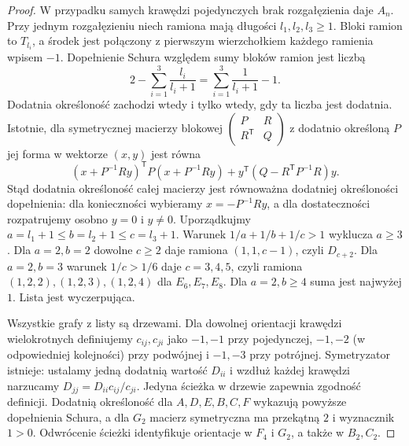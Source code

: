 \begin{proof}
W przypadku samych krawędzi pojedynczych brak
rozgałęzienia daje $A_n$. Przy jednym rozgałęzieniu
niech ramiona mają długości $l_1,l_2,l_3\ge1$.
Bloki ramion to $T_{l_i}$, a środek jest połączony
z pierwszym wierzchołkiem każdego ramienia wpisem $-1$.
Dopełnienie Schura względem sumy bloków ramion
jest liczbą
\[
 2-\sum_{i=1}^3\frac{l_i}{l_i+1}
 =\sum_{i=1}^3\frac1{l_i+1}-1.
\]
Dodatnia określoność zachodzi wtedy i tylko wtedy,
gdy ta liczba jest dodatnia. Istotnie, dla symetrycznej macierzy blokowej
$\begin{pmatrix}P&R\\R^{\mathsf T}&Q\end{pmatrix}$
z dodatnio określoną $P$ jej forma w wektorze $(x,y)$
jest równa
\[
 (x+P^{-1}Ry)^{\mathsf T}P(x+P^{-1}Ry)
 +y^{\mathsf T}(Q-R^{\mathsf T}P^{-1}R)y.
\]
Stąd dodatnia określoność całej macierzy jest
równoważna dodatniej określoności dopełnienia:
dla konieczności wybieramy $x=-P^{-1}Ry$,
a dla dostateczności rozpatrujemy osobno $y=0$
i $y\ne0$.
Uporządkujmy $a=l_1+1\le b=l_2+1\le c=l_3+1$.
Warunek $1/a+1/b+1/c>1$ wyklucza $a\ge3$.
Dla $a=2,b=2$ dowolne $c\ge2$ daje ramiona
$(1,1,c-1)$, czyli $D_{c+2}$.
Dla $a=2,b=3$ warunek $1/c>1/6$ daje $c=3,4,5$,
czyli ramiona $(1,2,2),(1,2,3),(1,2,4)$
dla $E_6,E_7,E_8$.
Dla $a=2,b\ge4$ suma jest najwyżej $1$.
Lista jest wyczerpująca.

Wszystkie grafy z listy są drzewami. Dla dowolnej
orientacji krawędzi wielokrotnych definiujemy
$c_{ij},c_{ji}$ jako $-1,-1$ przy pojedynczej,
$-1,-2$ (w odpowiedniej kolejności) przy podwójnej
i $-1,-3$ przy potrójnej. Symetryzator istnieje:
ustalamy jedną dodatnią wartość $D_{ii}$ i wzdłuż
każdej krawędzi narzucamy
$D_{jj}=D_{ii}c_{ij}/c_{ji}$. Jedyna ścieżka
w drzewie zapewnia zgodność definicji.
Dodatnią określoność dla $A,D,E,B,C,F$ wykazują
powyższe dopełnienia Schura, a dla $G_2$ macierz
symetryczna ma przekątną $2$ i wyznacznik $1>0$.
Odwrócenie ścieżki identyfikuje orientacje w $F_4$
i $G_2$, a także w $B_2,C_2$.
\end{proof}

